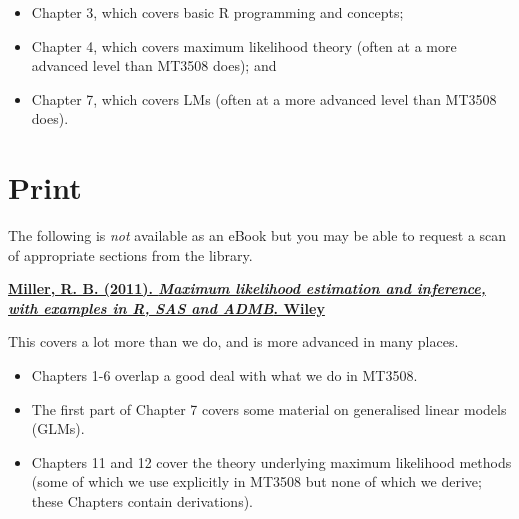 \documentclass[
  openany]{book}
\providecommand{\tightlist}{%
  \setlength{\itemsep}{0pt}\setlength{\parskip}{0pt}}
\begin{document}
\begin{itemize}
\tightlist
\item
  Chapter 3, which covers basic R programming and concepts;
\item
  Chapter 4, which covers maximum likelihood theory (often at a more advanced level than MT3508 does); and
\item
  Chapter 7, which covers LMs (often at a more advanced level than MT3508 does).
\end{itemize}

\hypertarget{print}{%
\section*{Print}\label{print}}

The following is \emph{not} available as an eBook but you may be able to request a scan of appropriate sections from the library.

\href{https://encore.st-andrews.ac.uk/iii/encore/record/C__Rb1908113__SMaximum\%20likelihood\%20estimation\%20and\%20inference\%2C\%20with\%20examples\%20in\%20R\%2C\%20SAS\%20and\%20ADMB__Orightresult__U__X4?lang=eng\&suite=def}{\textbf{Miller, R. B. (2011). \emph{Maximum likelihood estimation and inference, with examples in R, SAS and ADMB}. Wiley}}

This covers a lot more than we do, and is more advanced in many places.

\begin{itemize}
\tightlist
\item
  Chapters 1-6 overlap a good deal with what we do in MT3508.
\item
  The first part of Chapter 7 covers some material on generalised linear models (GLMs).
\item
  Chapters 11 and 12 cover the theory underlying maximum likelihood methods (some of which we use explicitly in MT3508 but none of which we derive; these Chapters contain derivations).
\end{itemize}

  

\printindex
\end{document}
